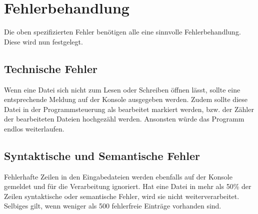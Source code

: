 \section{Fehlerbehandlung}\label{sec:fehlerbehandlung}
Die oben spezifizierten Fehler benötigen alle eine sinnvolle Fehlerbehandlung.
Diese wird nun festgelegt.

\subsection{Technische Fehler}\label{subsec:technische-fehler-behandlung}
Wenn eine Datei sich nicht zum Lesen oder Schreiben öffnen lässt, sollte eine entsprechende Meldung auf der Konsole ausgegeben werden.
Zudem sollte diese Datei in der Programmsteuerung als bearbeitet markiert werden, bzw. der Zähler der bearbeiteten Dateien hochgezähl werden.
Ansonsten würde das Programm endlos weiterlaufen.

\subsection{Syntaktische und Semantische Fehler}\label{subsec:syntaktische-semant-fehler-behandlung}
Fehlerhafte Zeilen in den Eingabedateien werden ebenfalls auf der Konsole gemeldet und für die Verarbeitung ignoriert.
Hat eine Datei in mehr als 50\% der Zeilen syntaktische oder semantische Fehler, wird sie nicht weiterverarbeitet.
Selbiges gilt, wenn weniger als 500 fehlerfreie Einträge vorhanden sind.



